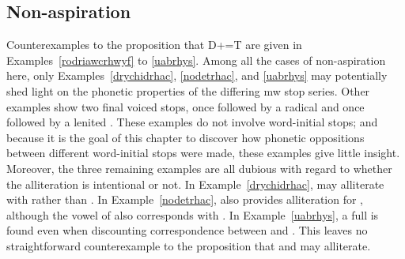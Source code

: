 \subsection{Non-aspiration}     
\label{sec:non-aspiration-1}
Counterexamples to the proposition that \gls{D}+=\gls{T} are given in Examples~\ref{rodriawcrhwyf} to \ref{uabrhys}.
Among all the cases of non-aspiration here, only Examples~\ref{drychidrhac}, \ref{nodetrhac}, and \ref{uabrhys} may potentially shed light on the phonetic properties of the differing \gls{mw} stop series. Other examples show two final voiced stops, once followed by a radical  and once followed by a lenited . These examples do not involve word-initial stops; and because it is the goal of this chapter to discover how phonetic oppositions between different word-initial stops were made, these examples give little insight. Moreover, the three remaining examples are all dubious with regard to whether the alliteration is intentional or not. In Example~\ref{drychidrhac},  may alliterate with  rather than . In Example~\ref{nodetrhac},  also provides alliteration for , although the vowel of    also corresponds with . In Example~\ref{uabrhys}, a full  is found even when discounting correspondence between  and . 
This leaves no straightforward counterexample to the proposition that  and  may alliterate.
